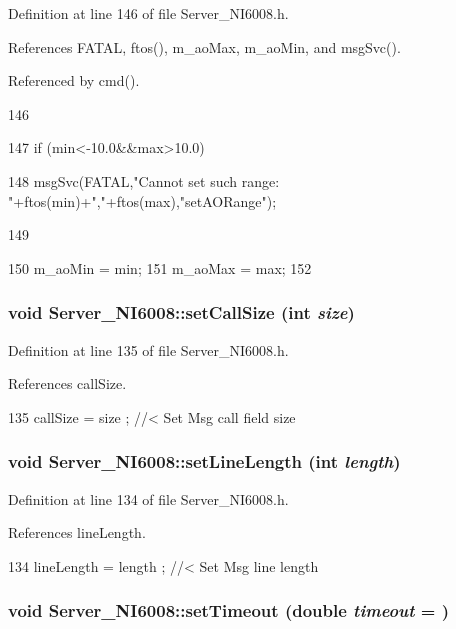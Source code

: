 Definition at line 146 of file Server\_\-NI6008.h.

References FATAL, ftos(), m\_\-aoMax, m\_\-aoMin, and msgSvc().

Referenced by cmd().


\begin{DoxyCode}
146                                                {
147     if (min<-10.0&&max>10.0){
148     msgSvc(FATAL,"Cannot set such range: "+ftos(min)+","+ftos(max),"setAORange");
      
149     }
150     m_aoMin = min;
151     m_aoMax = max;
152   }
\end{DoxyCode}
\hypertarget{classServer__NI6008_ae2eab1871efb0ec0a7c0c72f56604e13}{
\subsubsection[{setCallSize}]{\setlength{\rightskip}{0pt plus 5cm}void Server\_\-NI6008::setCallSize (int {\em size})}}
\label{classServer__NI6008_ae2eab1871efb0ec0a7c0c72f56604e13}


Definition at line 135 of file Server\_\-NI6008.h.

References callSize.


\begin{DoxyCode}
135 { callSize   = size  ; } //< Set Msg call field size
\end{DoxyCode}
\hypertarget{classServer__NI6008_adc52659db137940242998e8e0b980c03}{
\subsubsection[{setLineLength}]{\setlength{\rightskip}{0pt plus 5cm}void Server\_\-NI6008::setLineLength (int {\em length})}}
\label{classServer__NI6008_adc52659db137940242998e8e0b980c03}


Definition at line 134 of file Server\_\-NI6008.h.

References lineLength.


\begin{DoxyCode}
134 { lineLength = length ; } //< Set Msg line length
\end{DoxyCode}
\hypertarget{classServer__NI6008_ade018df1c5afac06e6d528536635ba48}{
\subsubsection[{setTimeout}]{\setlength{\rightskip}{0pt plus 5cm}void Server\_\-NI6008::setTimeout (double {\em timeout} = {})}}
\label{classServer__NI6008_ade018df1c5afac06e6d528536635ba48}



